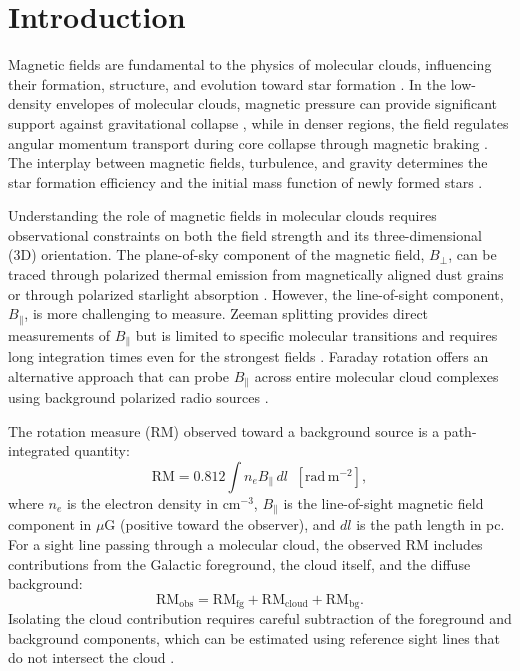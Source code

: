 \documentclass[twocolumn]{aastex701}
\begin{document}

\section{Introduction}
\label{sec:intro}

Magnetic fields are fundamental to the physics of molecular clouds, influencing their formation, structure, and evolution toward star formation \citep{crutcher2012,hennebelle2019}. In the low-density envelopes of molecular clouds, magnetic pressure can provide significant support against gravitational collapse \citep{mouschovias1976}, while in denser regions, the field regulates angular momentum transport during core collapse through magnetic braking \citep{pudritz2019}. The interplay between magnetic fields, turbulence, and gravity determines the star formation efficiency and the initial mass function of newly formed stars \citep{krumholz2019,federrath2015}.

Understanding the role of magnetic fields in molecular clouds requires observational constraints on both the field strength and its three-dimensional (3D) orientation. The plane-of-sky component of the magnetic field, $B_\perp$, can be traced through polarized thermal emission from magnetically aligned dust grains \citep{planck2016,pattle2023} or through polarized starlight absorption \citep{heiles2000}. However, the line-of-sight component, $B_\parallel$, is more challenging to measure. Zeeman splitting provides direct measurements of $B_\parallel$ but is limited to specific molecular transitions and requires long integration times even for the strongest fields \citep{crutcher2010}. Faraday rotation offers an alternative approach that can probe $B_\parallel$ across entire molecular cloud complexes using background polarized radio sources \citep{wolleben2004}.

The rotation measure (RM) observed toward a background source is a path-integrated quantity:
\begin{equation}
\label{eq:rm-basic}
    \mathrm{RM} = 0.812 \int n_e B_\parallel \, dl \;\;[\mathrm{rad\,m^{-2}}],
\end{equation}
where $n_e$ is the electron density in cm$^{-3}$, $B_\parallel$ is the line-of-sight magnetic field component in $\mu$G (positive toward the observer), and $dl$ is the path length in pc. For a sight line passing through a molecular cloud, the observed RM includes contributions from the Galactic foreground, the cloud itself, and the diffuse background:
\begin{equation}
\label{eq:rm-split}
    \mathrm{RM_{obs}} = \mathrm{RM_{fg}} + \mathrm{RM_{cloud}} + \mathrm{RM_{bg}}.
\end{equation}
Isolating the cloud contribution requires careful subtraction of the foreground and background components, which can be estimated using reference sight lines that do not intersect the cloud \citep{tahani2018}.
\end{document}
